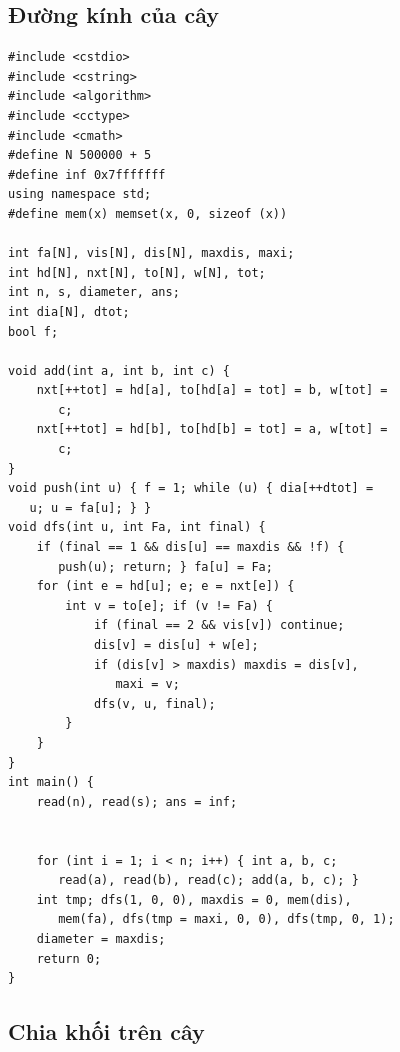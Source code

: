 \documentclass[11pt]{article}
\begin{document}
\subsection{Đường kính của cây}

\begingroup
\footnotesize
\begin{verbatim}
#include <cstdio>
#include <cstring>
#include <algorithm>
#include <cctype>
#include <cmath>
#define N 500000 + 5
#define inf 0x7fffffff
using namespace std;
#define mem(x) memset(x, 0, sizeof (x))

int fa[N], vis[N], dis[N], maxdis, maxi;
int hd[N], nxt[N], to[N], w[N], tot;
int n, s, diameter, ans;
int dia[N], dtot;
bool f;

void add(int a, int b, int c) {
    nxt[++tot] = hd[a], to[hd[a] = tot] = b, w[tot] =
       c;
    nxt[++tot] = hd[b], to[hd[b] = tot] = a, w[tot] =
       c;
}
void push(int u) { f = 1; while (u) { dia[++dtot] =
   u; u = fa[u]; } }
void dfs(int u, int Fa, int final) {
    if (final == 1 && dis[u] == maxdis && !f) {
       push(u); return; } fa[u] = Fa;
    for (int e = hd[u]; e; e = nxt[e]) {
        int v = to[e]; if (v != Fa) {
            if (final == 2 && vis[v]) continue;
            dis[v] = dis[u] + w[e];
            if (dis[v] > maxdis) maxdis = dis[v],
               maxi = v;
            dfs(v, u, final);
        }
    }
}
int main() {
    read(n), read(s); ans = inf;


    for (int i = 1; i < n; i++) { int a, b, c;
       read(a), read(b), read(c); add(a, b, c); }
    int tmp; dfs(1, 0, 0), maxdis = 0, mem(dis),
       mem(fa), dfs(tmp = maxi, 0, 0), dfs(tmp, 0, 1);
    diameter = maxdis;
    return 0;
}
\end{verbatim}
\endgroup

\subsection{Chia khối trên cây}
\end{document}
